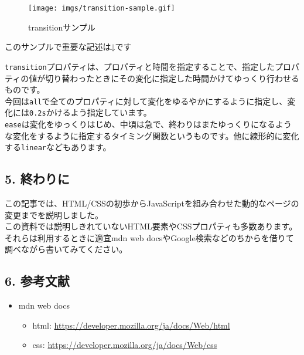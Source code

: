 \begin{figure}
\centering
\texttt{[image: imgs/transition-sample.gif]}
\caption{transitionサンプル}
\end{figure}

このサンプルで重要な記述は↓です

\begin{Shaded}
\begin{Highlighting}[]
  \NormalTok{ \{}
    \NormalTok{: }  \OperatorTok{;}
\NormalTok{  \}}
\end{Highlighting}
\end{Shaded}

\texttt{transition}プロパティは、プロパティと時間を指定することで、指定したプロパティの値が切り替わったときにその変化に指定した時間かけてゆっくり行わせるものです。\\
今回は\texttt{all}で全てのプロパティに対して変化をゆるやかにするように指定し、変化には\texttt{0.2s}かけるよう指定しています。\\
\texttt{ease}は変化をゆっくりはじめ、中頃は急で、終わりはまたゆっくりになるような変化をするように指定するタイミング関数というものです。他に線形的に変化する\texttt{linear}などもあります。

\subsection{5. 終わりに}\label{ux7d42ux308fux308aux306b}

この記事では、HTML/CSSの初歩からJavaScriptを組み合わせた動的なページの変更までを説明しました。\\
この資料では説明しきれていないHTML要素やCSSプロパティも多数あります。\\
それらは利用するときに適宜mdn web
docsやGoogle検索などのちからを借りて調べながら書いてみてください。

\subsection{6. 参考文献}\label{ux53c2ux8003ux6587ux732e}

\begin{itemize}
\tightlist
\item
  mdn web docs

  \begin{itemize}
  \tightlist
  \item
    html: \url{https://developer.mozilla.org/ja/docs/Web/html}
  \item
    css: \url{https://developer.mozilla.org/ja/docs/Web/css}
  \end{itemize}
\end{itemize}
